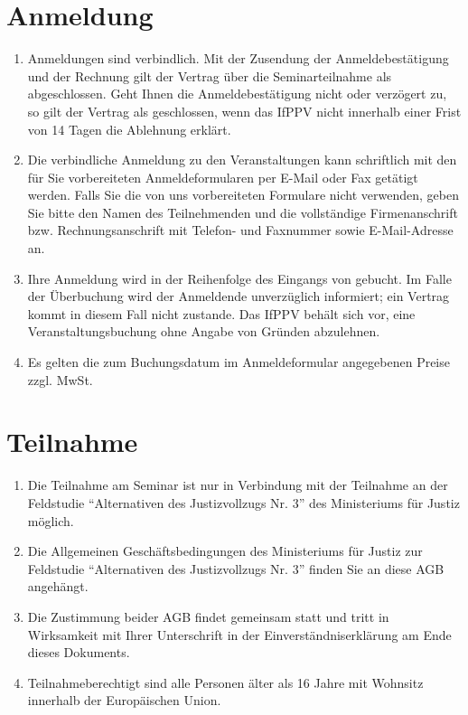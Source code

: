 \documentclass[a4paper, 12pt]{scrartcl}
\begin{document}
    \section{Anmeldung}
    \begin{enumerate}
        \item Anmeldungen sind verbindlich.
        Mit der Zusendung der Anmeldebestätigung und der Rechnung gilt der Vertrag über die Seminarteilnahme als abgeschlossen.
        Geht Ihnen die Anmeldebestätigung nicht oder verzögert zu, so gilt der Vertrag als geschlossen, wenn das IfPPV nicht innerhalb einer Frist von 14 Tagen die Ablehnung erklärt.

        \item Die verbindliche Anmeldung zu den Veranstaltungen kann schriftlich mit den für Sie vorbereiteten Anmeldeformularen per E-Mail oder Fax getätigt werden.
        Falls Sie die von uns vorbereiteten Formulare nicht verwenden, geben Sie bitte den Namen des Teilnehmenden und die vollständige Firmenanschrift bzw. Rechnungsanschrift mit Telefon- und Faxnummer sowie E-Mail-Adresse an.

        \item Ihre Anmeldung wird in der Reihenfolge des Eingangs von gebucht.
        Im Falle der Überbuchung wird der Anmeldende unverzüglich informiert; ein Vertrag kommt in diesem Fall nicht zustande.
        Das IfPPV beh\"alt sich vor, eine Veranstaltungsbuchung ohne Angabe von Gr\"unden abzulehnen.

        \item Es gelten die zum Buchungsdatum im Anmeldeformular angegebenen Preise zzgl. MwSt.
    \end{enumerate}

    \section{Teilnahme}
    \begin{enumerate}
        \item Die Teilnahme am Seminar ist nur in Verbindung mit der Teilnahme an der Feldstudie \enquote{Alternativen des Justizvollzugs Nr. 3} des Ministeriums f\"ur Justiz m\"oglich.
        
        \item Die Allgemeinen Gesch\"aftsbedingungen des Ministeriums f\"ur Justiz zur Feldstudie \enquote{Alternativen des Justizvollzugs Nr. 3} finden Sie an diese AGB angeh\"angt.
        
        \item Die Zustimmung beider AGB findet gemeinsam statt und tritt in Wirksamkeit mit Ihrer Unterschrift in der Einverst\"andniserkl\"arung am Ende dieses Dokuments.

	    \item Teilnahmeberechtigt sind alle Personen \"alter als 16 Jahre mit Wohnsitz innerhalb der Europ\"aischen Union.
    \end{enumerate}
\end{document}
